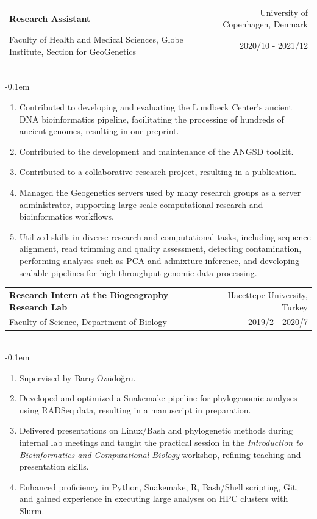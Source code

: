 \documentclass[letterpaper,10.5pt]{article}
\makeatletter
\newcommand{\cvSubheading}[5]{
  \vspace{-1pt}\item
    \begin{tabular*}{0.97\textwidth}{l@{\extracolsep{\fill}}r}
      \textbf{#1} & #2 \\
      {\small#3} & {\small #4} \\
    \end{tabular*}\vspace{3pt} \\
    #5
}
\makeatother
\begin{document}
    \medskip
  
        \cvSubheading
        {Research Assistant}
        {University of Copenhagen, Denmark}
        {Faculty of Health and Medical Sciences, Globe Institute, Section for GeoGenetics}
        {2020/10 - 2021/12}
          \vspace{-0.1em} \begin{enumerate}[label=\textbf{-},nosep,wide,  labelindent=0pt]
        \item Contributed to developing and evaluating the Lundbeck Center's ancient DNA bioinformatics pipeline, facilitating the processing of hundreds of ancient genomes, resulting in one preprint.
        \item Contributed to the development and maintenance of the \href{https://github.com/ANGSD/angsd/}{ANGSD} toolkit.
        \item Contributed to a collaborative research project, resulting in a publication.
        \item Managed the Geogenetics servers used by many research groups as a server administrator, supporting large-scale computational research and bioinformatics workflows.
        \item Utilized skills in diverse research and computational tasks, including sequence alignment, read trimming and quality assessment, detecting contamination, performing analyses such as PCA and admixture inference, and developing scalable pipelines for high-throughput genomic data processing.
        \end{enumerate}

    \medskip

    \cvSubheading
        {Research Intern at the Biogeography Research Lab}
        {Hacettepe University, Turkey}
        {Faculty of Science, Department of Biology}
        {2019/2 - 2020/7}
          \vspace{-0.1em} \begin{enumerate}[label=\textbf{-},nosep,wide,  labelindent=0pt]
        \item Supervised by Bar{\i}\c{s} \"{O}z\"{u}do\u{g}ru.
        \item Developed and optimized a Snakemake pipeline for phylogenomic analyses using RADSeq data, resulting in a manuscript in preparation.
        \item Delivered presentations on Linux/Bash and phylogenetic methods during internal lab meetings and taught the practical session in the \textit{Introduction to Bioinformatics and Computational Biology} workshop, refining teaching and presentation skills.
        \item Enhanced proficiency in Python, Snakemake, R, Bash/Shell scripting, Git, and gained experience in executing large analyses on HPC clusters with Slurm.
        \end{enumerate}
    \medskip
\end{document}
